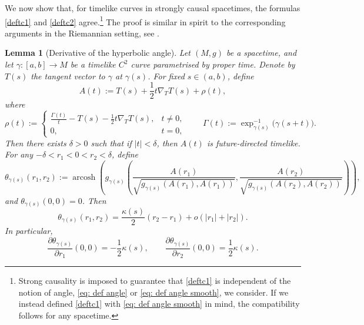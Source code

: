 \documentclass[hidelinks,12pt,a4paper]{article}
\numberwithin{equation}{section}
\theoremstyle{plain}
\newtheorem{lemma}[definition]{Lemma}
\theoremstyle{definition}
\DeclareMathOperator{\arcosh}{arcosh}
\begin{document}
We now show that, for timelike curves in strongly causal spacetimes, the formulas \eqref{deftc1} and \eqref{deftc2} agree.\footnote{Strong causality is imposed to guarantee that \eqref{deftc1} is independent of the notion of angle, \eqref{eq: def angle} or \eqref{eq: def angle smooth}, we consider. 
If we instead defined \eqref{deftc1} with \eqref{eq: def angle smooth} in mind, the compatibility follows for any spacetime.} 
The proof is similar in spirit to the corresponding arguments in the Riemannian setting, see \cite[Theorem 3.4]{LMM2010}.
\begin{lemma}[Derivative of the hyperbolic angle]
\label{lem}
Let $(M,g)$ be a spacetime, and let $\gamma \colon [a,b] \to M$ be a timelike $C^2$ curve parametrised by proper time. 
Denote by $T(s)$ the tangent vector to $\gamma$ at $\gamma(s)$. 
For fixed $s \in (a,b)$, define
\begin{equation*}
A(t):=T(s)+\frac12 t\nabla_TT(s)+\rho(t),
\end{equation*}
where
\begin{equation*}
\rho(t):=
\begin{cases}
\frac{\Gamma(t)}{t}-T(s)-\frac{1}{2}t\nabla_TT(s), & t\neq 0,\\
0, & t=0,
\end{cases} 
\qquad \Gamma(t):=\exp_{\gamma(s)}^{-1}\bigl(\gamma(s+t)\bigr).    
\end{equation*}
Then there exists $\delta > 0$ such that if $|t|<\delta$, then $A(t)$ is future-directed timelike. 
For any $-\delta<r_1<0<r_2<\delta$, define
\begin{equation*}
\theta_{\gamma(s)}(r_1,r_2):=\arcosh\left(g_{\gamma(s)}\left(\frac{A(r_1)}{\sqrt{g_{\gamma(s)}(A(r_1),A(r_1))}},\frac{A(r_2)}{\sqrt{g_{\gamma(s)}(A(r_2),A(r_2))}}\right)\right), 
\end{equation*}
and $\theta_{\gamma(s)}(0,0)=0$.
Then 
\begin{equation*}
\theta_{\gamma(s)}(r_1,r_2) = \frac{\kappa(s)}{2}(r_2-r_1) + o(|r_1|+|r_2|).
\end{equation*}
In particular, 
\begin{equation}
\label{eq: partial derivatives angle}
\frac{\partial \theta_{\gamma(s)}}{\partial r_1}(0,0)=-\frac12 \kappa(s),
\qquad
\frac{\partial \theta_{\gamma(s)}}{\partial r_2}(0,0)=\frac12 \kappa(s).
\end{equation}
\end{lemma}
\end{document}
